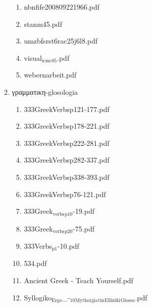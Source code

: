 \documentclass[11pt]{article}
\begin{document}
\begin{enumerate}
\begin{enumerate}
\begin{enumerate}
\item nbnfife200809221966.pdf
\label{sec-1-1-1-1-49-2-2-1-83-25}

\item stanm45.pdf
\label{sec-1-1-1-1-49-2-2-1-83-26}

\item umzbfsrst6rac25j6l8.pdf
\label{sec-1-1-1-1-49-2-2-1-83-27}

\item visual$_{\text{icmc05}}$.pdf
\label{sec-1-1-1-1-49-2-2-1-83-28}

\item webernarbeit.pdf
\label{sec-1-1-1-1-49-2-2-1-83-29}
\end{enumerate}

\item γραμματικη-glosologia
\label{sec-1-1-1-1-49-2-2-1-84}
\begin{enumerate}
\item 333GreekVerbsp121-177.pdf
\label{sec-1-1-1-1-49-2-2-1-84-1}

\item 333GreekVerbsp178-221.pdf
\label{sec-1-1-1-1-49-2-2-1-84-2}

\item 333GreekVerbsp222-281.pdf
\label{sec-1-1-1-1-49-2-2-1-84-3}

\item 333GreekVerbsp282-337.pdf
\label{sec-1-1-1-1-49-2-2-1-84-4}

\item 333GreekVerbsp338-393.pdf
\label{sec-1-1-1-1-49-2-2-1-84-5}

\item 333GreekVerbsp76-121.pdf
\label{sec-1-1-1-1-49-2-2-1-84-6}

\item 333Greek$_{\text{verbs}}$$_{\text{p10}}$-19.pdf
\label{sec-1-1-1-1-49-2-2-1-84-7}

\item 333Greek$_{\text{verbs}}$$_{\text{p20}}$-75.pdf
\label{sec-1-1-1-1-49-2-2-1-84-8}

\item 333Verbs$_{\text{p1}}$-10.pdf
\label{sec-1-1-1-1-49-2-2-1-84-9}

\item 534.pdf
\label{sec-1-1-1-1-49-2-2-1-84-10}

\item Ancient Greek - Teach Yourself.pdf
\label{sec-1-1-1-1-49-2-2-1-84-11}

\item Syllogiko$_{\text{Ergo}}$\_-$_{\text{10}}$$_{\text{Mythoi}}$$_{\text{gia}}$$_{\text{tin}}$$_{\text{Elliniki}}$$_{\text{Glossa}}$.pdf
\label{sec-1-1-1-1-49-2-2-1-84-12}


\end{enumerate}
\end{enumerate}
\end{enumerate}
\end{document}
